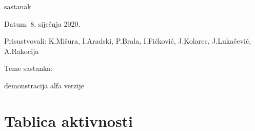\begin{packed_enum}
			\item  sastanak
			\item[] \begin{packed_item}
				\item Datum: 8. siječnja 2020.
				\item Prisustvovali:  K.Mišura, I.Aradski, P.Brala, I.Fićković, J.Kolarec, J.Lukačević, A.Rakocija
				\item Teme sastanka:
				\begin{packed_item}
					\item  demonstracija alfa verzije 
				\end{packed_item}
			\end{packed_item}
			
		\end{packed_enum}
		
		\eject
		\section*{Tablica aktivnosti}
		
			
					
						
			
